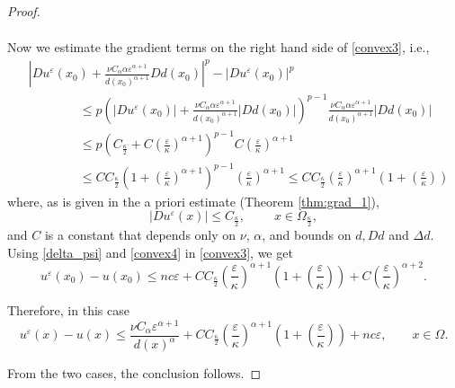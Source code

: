 \documentclass[12pt,reqno]{amsart}
\numberwithin{figure}{section}
\theoremstyle{plain}
\theoremstyle{remark}
\numberwithin{equation}{section}
\begin{document}
\begin{proof}
\begin{itemize}
\begin{align}
\end{align}
Now we estimate the gradient terms on the right hand side of \eqref{convex3}, i.e., 
\begin{align}\label{convex4}
    &\left|Du^\varepsilon(x_0) + \frac{\nu C_\alpha \alpha \varepsilon^{\alpha+1}}{d(x_0)^{\alpha+1}}D d(x_0)\right|^p - |Du^\varepsilon(x_0)|^p\nonumber \\
    &\qquad \qquad \leq p\left(|Du^\varepsilon(x_0)| + \frac{\nu C_\alpha \alpha \varepsilon^{\alpha+1}}{d(x_0)^{\alpha+1}}\left|D d(x_0)\right|\right)^{p-1} \frac{\nu C_\alpha \alpha \varepsilon^{\alpha+1}}{d(x_0)^{\alpha+1}}|D d(x_0)|\nonumber\\
    &\qquad \qquad \leq p\left(C_\frac{\kappa}{2} + C\left(\frac{\varepsilon}{\kappa}\right)^{\alpha+1}\right)^{p-1} C\left(\frac{\varepsilon}{\kappa}\right)^{\alpha+1}\nonumber\\
    &\qquad\qquad\leq CC_\frac{\kappa}{2}\left(1+\left(\frac{\varepsilon}{\kappa}\right)^{\alpha+1}\right)^{p-1} \left(\frac{\varepsilon}{\kappa}\right)^{\alpha+1} \leq CC_\frac{\kappa}{2} \left(\frac{\varepsilon}{\kappa}\right)^{\alpha+1}\left(1+ \left(\frac{\varepsilon}{\kappa}\right)\right)
\end{align}
where, as is given in the a priori estimate (Theorem \ref{thm:grad_1}),
\begin{equation}\label{est_Ckappa}
    |Du^\varepsilon(x)|\leq C_{\frac{\kappa}{2}}, \qquad \;x\in \Omega_{\frac{\kappa}{2}},
\end{equation}
and $C$ is a constant that depends only on $\nu$, $\alpha$, and bounds on $d,Dd$ and $\Delta d$. Using \eqref{delta_psi} and \eqref{convex4} in \eqref{convex3}, we get
\begin{equation*}
    u^\varepsilon(x_0) - u(x_0) \leq nc\varepsilon + CC_\frac{\kappa}{2} \left(\frac{\varepsilon}{\kappa}\right)^{\alpha+1}\left(1+ \left(\frac{\varepsilon}{\kappa}\right)\right) + C\left(\frac{\varepsilon}{\kappa}\right)^{\alpha+2}.
\end{equation*}

Therefore, in this case 
\begin{equation*}
    u^\varepsilon(x) - u(x) \leq \frac{\nu C_\alpha \varepsilon^{\alpha+1}}{d(x)^\alpha} + CC_\frac{\kappa}{2} \left(\frac{\varepsilon}{\kappa}\right)^{\alpha+1}\left(1+ \left(\frac{\varepsilon}{\kappa}\right)\right) + nc\varepsilon, \qquad x\in \Omega.
\end{equation*}
\end{itemize}
From the two cases, the conclusion follows. 


\end{proof}
\end{document}
